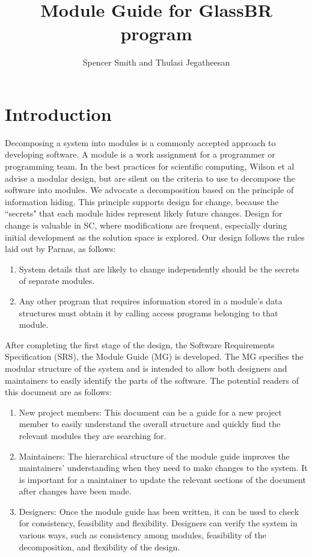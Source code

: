 \documentclass[12pt]{article}
\title{Module Guide for GlassBR program}
\author{Spencer Smith and Thulasi Jegatheesan}
\begin{document}
\maketitle
\tableofcontents
\newpage
\section{Introduction}
\label{Sec:Intr}
Decomposing a system into modules is a commonly accepted approach to developing software.  A module is a work assignment for a programmer or programming team. In the best practices for scientific computing, Wilson et al advise a modular design, but are silent on the criteria to use to decompose the software into modules.  We advocate a decomposition based on the principle of information hiding. This principle supports design for change, because the ``secrets" that each module hides represent likely future changes.  Design for change is valuable in SC, where modifications are frequent, especially during initial development as the solution space is explored.
Our design follows the rules laid out by Parnas, as follows:
\begin{enumerate}
\item{System details that are likely to change independently should be the secrets of separate modules.}
\item{Any other program that requires information stored in a module's data structures must obtain it by calling access programs belonging to that module.}
\end{enumerate}
After completing the first stage of the design, the Software Requirements Specification (SRS), the Module Guide (MG) is developed. The MG specifies the modular structure of the system and is intended to allow both designers and maintainers to easily identify the parts of the software.  The potential readers of this document are as follows:
\begin{enumerate}
\item{New project members: This document can be a guide for a new project member to easily understand the overall structure and quickly find the relevant modules they are searching for.}
\item{Maintainers: The hierarchical structure of the module guide improves the maintainers' understanding when they need to make changes to the system. It is important for a maintainer to update the relevant sections of the document after changes have been made.}
\item{Designers: Once the module guide has been written, it can be used to check for consistency, feasibility and flexibility. Designers can verify the system in various ways, such as consistency among modules, feasibility of the decomposition, and flexibility of the design.}
\end{enumerate}
\end{document}
